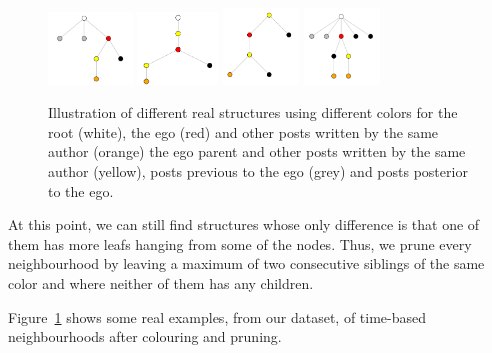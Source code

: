 \documentclass[conference]{IEEEtran}
\begin{document}
\begin{figure}
\centering
\includegraphics[width=0.2\textwidth]{neighbourhood_time_342}
\includegraphics[width=0.19\textwidth]{neighbourhood_time_456}
\includegraphics[width=0.18\textwidth]{neighbourhood_time_501}
\includegraphics[width=0.18\textwidth]{neighbourhood_time_524}
\caption{Illustration of different real structures using different colors for the root (white), the ego (red) and other posts written by the same author (orange) the ego parent and other posts written by the same author (yellow), posts previous to the ego (grey) and posts posterior to the ego.}
\label{fig:colors}
\end{figure}

At this point, we can still find structures whose only difference is that one of them has more leafs hanging from some of the nodes. Thus, we prune every neighbourhood by leaving a maximum of two consecutive siblings of the same color and where neither of them has any children.

Figure~\ref{fig:colors} shows some real examples, from our dataset, of time-based neighbourhoods after colouring and pruning.
\end{document}

